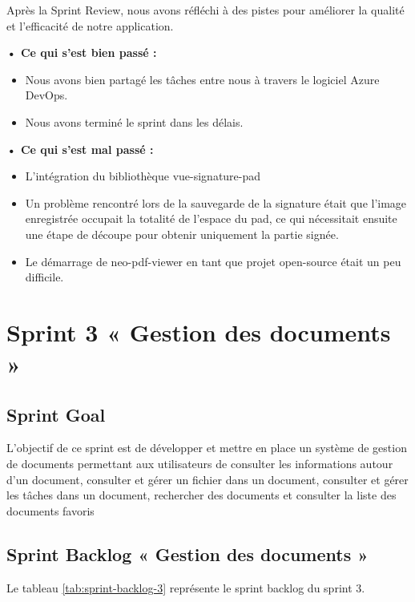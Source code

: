 Après la Sprint Review, nous avons réfléchi à des pistes pour améliorer la qualité et l'efficacité de notre application.

\noindent\textbf{• Ce qui s'est bien passé :}
\begin{itemize}
  \item Nous avons bien partagé les tâches entre nous à travers le logiciel Azure DevOps. 
  \item Nous avons terminé le sprint dans les délais.
\end{itemize}

\noindent\textbf{• Ce qui s'est mal passé :}
\begin{itemize}
  \item L'intégration du bibliothèque vue-signature-pad
  \item Un problème rencontré lors de la sauvegarde de la signature était que l'image enregistrée occupait la totalité de l'espace du pad, ce qui nécessitait ensuite une étape de découpe pour obtenir uniquement la partie signée.
  \item Le démarrage de neo-pdf-viewer en tant que projet open-source était un peu difficile.
\end{itemize}

\section{Sprint 3 « Gestion des documents »}
\subsection{Sprint Goal}

L'objectif de ce sprint est de développer et mettre en place un système de gestion de documents permettant aux utilisateurs de consulter les informations autour d'un document, consulter et gérer un fichier dans un document, consulter et gérer les tâches dans un document, rechercher des documents et consulter la liste des documents  favoris

\pagebreak

\subsection{Sprint Backlog « Gestion des documents »}

Le tableau \ref{tab:sprint-backlog-3} représente le sprint backlog du sprint 3.

